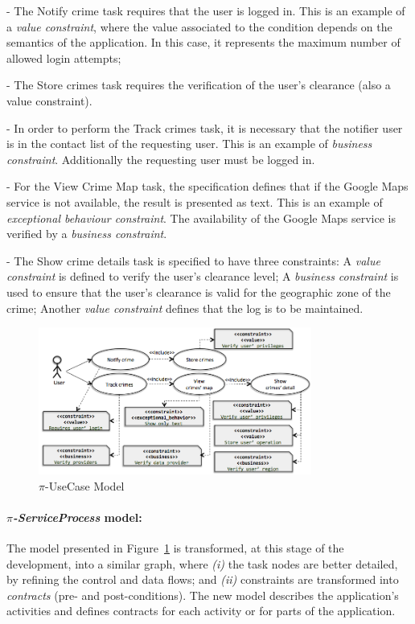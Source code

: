 \begin{trivlist}
  \item[-] The \textsf{Notify crime} task requires that the user is logged in. 
  This is an example of a \textit{value constraint}, where the value associated to the condition depends on the semantics of the application.
  In this case, it represents the maximum number of allowed login attempts;
\item[-] The \textsf{Store crimes} task requires the verification of the user's clearance (also a value constraint). 
\item[-] In order to perform the \textsf{Track crimes} task, it is necessary that the notifier user is in the contact list of the requesting user.
This is an example of \textit{business constraint}.
Additionally the requesting user must be logged in.
\item[-]  For the \textsf{View Crime Map} task, the specification defines that if the Google Maps service is not available, the result is presented as text. This is an example of \textit{exceptional behaviour constraint}. 
The availability of the Google Maps service is verified by a \textit{business constraint}.
 \item[-] The \textsf{Show crime details} task is specified to have three constraints: A \textit{value constraint} is defined to verify the user's clearance level; A \textit{business constraint} is used to ensure that the user's clearance is valid for the geographic zone of the crime; Another \textit{value constraint} defines that the log is to be maintained.
\end{trivlist}
\begin{figure}[ht!]
\centering
\includegraphics[width=0.8\textwidth]{figs/piUseCase}
\caption{$\pi$-UseCase Model}
\label{fig:piUC}
\end{figure}
\paragraph*{\textit{$\pi$-ServiceProcess} model:}
The model presented in Figure~\ref{fig:piUC} is transformed, at this stage of the development, into a similar graph, where \textit{(i)} the task nodes are better detailed, by refining the control and data flows; and \textit{(ii)} constraints are transformed into \textit{contracts} (pre- and post-conditions).
The new model describes the application's activities and defines contracts for each activity or for parts of the application.

